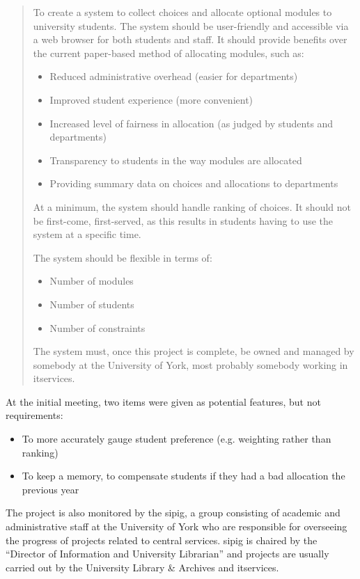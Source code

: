 \begin{quote}
  To create a system to collect choices and allocate optional modules to
  university students. The system should be user-friendly and accessible via a
  web browser for both students and staff. It should provide benefits over the
  current paper-based method of allocating modules, such as:
  
  \begin{itemize}
    \item Reduced administrative overhead (easier for departments)
    \item Improved student experience (more convenient)
    \item Increased level of fairness in allocation (as judged by students and departments)
    \item Transparency to students in the way modules are allocated
    \item Providing summary data on choices and allocations to departments
  \end{itemize}
  
  At a minimum, the system should handle ranking of choices. It should not be
  first-come, first-served, as this results in students having to use the
  system at a specific time.
  
  The system should be flexible in terms of:
  
  \begin{itemize}
    \item Number of modules
    \item Number of students
    \item Number of constraints
  \end{itemize}
  
  The system must, once this project is complete, be owned and managed by
  somebody at the University of York, most probably somebody working in
  \gls{itservices}.
  
\end{quote}

At the initial meeting, two items were given as potential features, but not
requirements:

\begin{itemize}
  \item To more accurately gauge student preference (e.g. weighting rather than ranking)
  \item To keep a memory, to compensate students if they had a bad allocation the previous year
\end{itemize}

The project is also monitored by the \gls{sipig}, a group consisting of
academic and administrative staff at the University of York who are
responsible for overseeing the progress of projects related to central
services. \gls{sipig} is chaired by the ``Director of Information and
University Librarian'' and projects are usually carried out by the University
Library \& Archives and \gls{itservices}.

